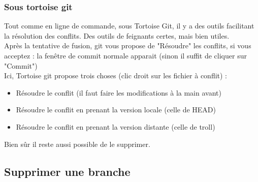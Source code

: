 \subsubsection{Sous tortoise git}

Tout comme en ligne de commande, sous Tortoise Git, il y a des outils facilitant la résolution des conflits. Des outils de feignants certes, mais bien utiles.\\
Après la tentative de fusion, git vous propose de "Résoudre" les conflits, si vous acceptez : la fenêtre de commit normale apparait (sinon il suffit de cliquer sur "Commit")\\

Ici, Tortoise git propose trois choses (clic droit sur les fichier à conflit) :
\begin{itemize}
\item Résoudre le conflit (il faut faire les modifications à la main avant)
\item Résoudre le conflit en prenant la version locale (celle de HEAD)
\item Résoudre le conflit en prenant la version distante (celle de troll)\\
\end{itemize}

Bien sûr il reste aussi possible de le supprimer.
\newpage
\subsection{Supprimer une branche}

